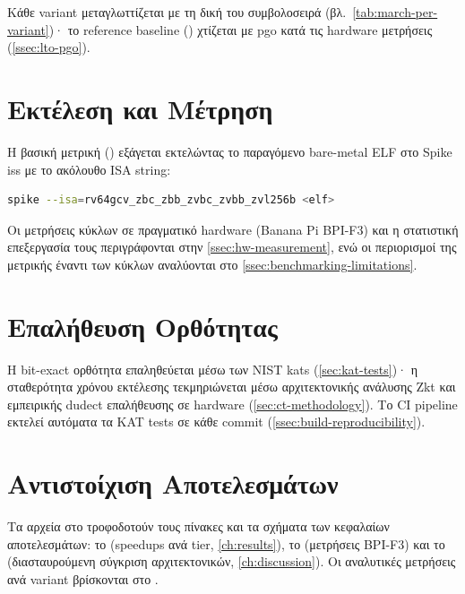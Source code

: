 \noindent
Κάθε variant μεταγλωττίζεται με τη δική του συμβολοσειρά 
(βλ.\ \cref{tab:march-per-variant})· το reference baseline
() χτίζεται με \gls{pgo} κατά τις hardware μετρήσεις
(\cref{ssec:lto-pgo}).

\section{Εκτέλεση και Μέτρηση}

Η βασική μετρική (\instret) εξάγεται εκτελώντας το παραγόμενο bare-metal ELF
στο Spike \gls{iss} με το ακόλουθο ISA string:

\begin{lstlisting}[language=bash, basicstyle=\ttfamily\small, breaklines=true]
spike --isa=rv64gcv_zbc_zbb_zvbc_zvbb_zvl256b <elf>
\end{lstlisting}

\noindent
Οι μετρήσεις κύκλων σε πραγματικό hardware (Banana Pi BPI-F3) και η στατιστική
επεξεργασία τους περιγράφονται στην \cref{ssec:hw-measurement}, ενώ οι περιορισμοί
της μετρικής \instret έναντι των κύκλων αναλύονται στο
\cref{ssec:benchmarking-limitations}.

\section{Επαλήθευση Ορθότητας}

Η bit-exact ορθότητα επαληθεύεται μέσω των NIST \glspl{kat}
(\cref{sec:kat-tests})· η σταθερότητα χρόνου εκτέλεσης τεκμηριώνεται μέσω
αρχιτεκτονικής ανάλυσης Zkt και εμπειρικής dudect επαλήθευσης σε hardware
(\cref{sec:ct-methodology}).  Το CI pipeline εκτελεί αυτόματα τα KAT tests
σε κάθε commit (\cref{ssec:build-reproducibility}).

\section{Αντιστοίχιση Αποτελεσμάτων}

Τα αρχεία στο  τροφοδοτούν τους πίνακες και τα
σχήματα των κεφαλαίων αποτελεσμάτων: το 
(speedups \instret ανά tier, \cref{ch:results}), το 
(μετρήσεις BPI-F3) και το  (διασταυρούμενη
σύγκριση αρχιτεκτονικών, \cref{ch:discussion}).  Οι αναλυτικές μετρήσεις ανά
variant βρίσκονται στο .
